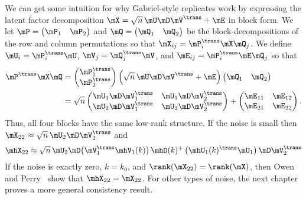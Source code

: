 We can get some intuition for why Gabriel-style replicates work by expressing 
the latent factor decomposition $\mX = \sqrt{n} \,\mU \mD \mV^\trans + \mE$ in 
block form.  We let
\(
    \mP
    =
    \left(
    \begin{matrix}
        \mP_1 &
        \mP_2
    \end{matrix}
    \right)
\)
and
\(
    \mQ
    =
    \left(
    \begin{matrix}
        \mQ_1 &
        \mQ_2
    \end{matrix}
    \right)
\)
be the block-decompositions of the row and column permutations so that
$\mX_{ij} = \mP_i^\trans \mX \mQ_j$.  We define $\mU_i = \mP_i^\trans \mU$,
$\mV_j = \mQ_j^\trans \mV$, and $\mE_{ij} = \mP_i^\trans \mE \mQ_j$ so that
\begin{align*}
    \mP^\trans \mX \mQ
        &=
            \left(
            \begin{matrix}
                \mP_1^\trans \\
                \mP_2^\trans
            \end{matrix}
            \right)
            \left(
                \sqrt{n} \, \mU \mD \mV^\trans + \mE
            \right)
            \left(
            \begin{matrix}
                \mQ_1 & \mQ_2
            \end{matrix}
            \right) \\
        &=
            \sqrt{n}
            \left(
            \begin{matrix}
                \mU_1 \mD \mV_1^\trans
                    & \mU_1 \mD \mV_2^\trans  \\
                \mU_2 \mD \mV_1^\trans
                    & \mU_2 \mD \mV_2^\trans
            \end{matrix}
            \right)
            +
            \left(
            \begin{matrix}
                \mE_{11} & \mE_{12} \\
                \mE_{21} & \mE_{22}
            \end{matrix}
            \right).
\end{align*}
Thus, all four blocks have the same low-rank structure.  If the noise is small 
then $\mX_{22} \approx \sqrt{n} \, \mU_2 \mD \mV_2^\trans$ and
\[
    \mhX_{22} 
        \approx 
            \sqrt{n} \,
                \mU_2 \mD 
                \big( \mV_1^\trans \mhV_1(k) \big) \,
                \mhD(k)^{+} \,
                \big( \mhU_1(k)^\trans \mU_1 \big) \,
                \mD \mV_2^\trans
\]
If the noise is exactly zero, $k = k_0$, and $\rank(\mX_{22}) = \rank(\mX)$, 
then Owen and Perry~\cite{owen2009bi} show that $\mhX_{22} = \mX_{22}$.  For 
other types of noise, the next chapter proves a more general consistency 
result.

